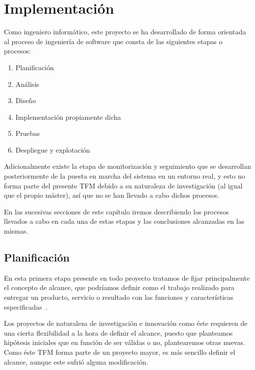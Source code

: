 
\section{Implementación} \label{capitulo:4}

Como ingeniero informático, este proyecto se ha desarrollado de forma orientada al proceso de ingeniería de software que consta de las siguientes etapas o procesos: 
\begin{enumerate}
    \item Planificación
    \item Análisis
    \item Diseño
    \item Implementación propiamente dicha
    \item Pruebas
    \item Despliegue y explotación    
\end{enumerate}
Adicionalmente existe la etapa de monitorización y seguimiento que se desarrollan posteriormente de la puesta en marcha del sistema en un entorno real, y esto no forma parte del presente TFM debido a su naturaleza de investigación (al igual que el propio máster), así que no se han llevado a cabo dichos procesos.

En las sucesivas secciones de este capítulo iremos describiendo los procesos llevados a cabo en cada una de estas etapas y las conclusiones alcanzadas en las mismas.

\subsection{Planificación}
\label{sec:4:planificacion}
En esta primera etapa presente en todo proyecto tratamos de fijar principalmente el concepto de alcance, que podríamos definir como el trabajo realizado para entregar un producto, servicio o resultado con
las funciones y características especificadas~\cite{PMBOK}.

Los proyectos de naturaleza de investigación e innovación como éste requieren de una cierta flexibilidad a la hora de definir el alcance, puesto que planteamos hipótesis iniciales que en función de ser válidas o no, plantearemos otras nuevas. Como éste TFM forma parte de un proyecto mayor, es más sencillo definir el alcance, aunque este sufrió alguna modificación.

